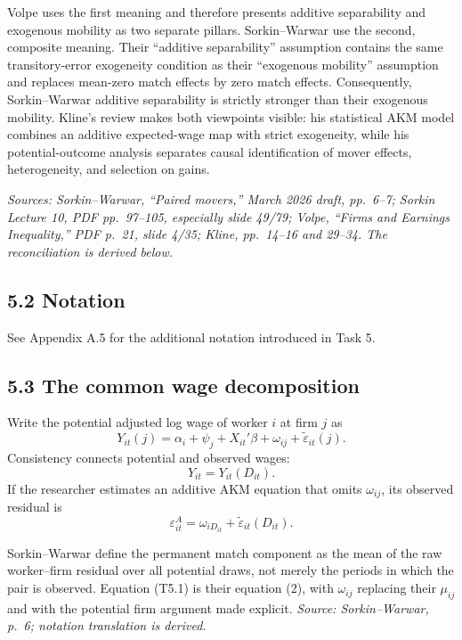\documentclass[11pt]{article}
\begin{document}
Volpe uses the first meaning and therefore presents additive separability and
exogenous mobility as two separate pillars.  Sorkin--Warwar use the second,
composite meaning.  Their ``additive separability'' assumption contains the
same transitory-error exogeneity condition as their ``exogenous mobility''
assumption and replaces mean-zero match effects by zero match effects.
Consequently, Sorkin--Warwar additive separability is strictly stronger than
their exogenous mobility.  Kline's review makes both viewpoints visible:
his statistical AKM model combines an additive expected-wage map with strict
exogeneity, while his potential-outcome analysis separates causal
identification of mover effects, heterogeneity, and selection on gains.

\textit{Sources: Sorkin--Warwar, ``Paired movers,'' March 2026 draft,
pp.\ 6--7; Sorkin Lecture 10, PDF pp.\ 97--105, especially slide 49/79;
Volpe, ``Firms and Earnings Inequality,'' PDF p.\ 21, slide 4/35; Kline,
pp.\ 14--16 and 29--34.  The reconciliation is derived below.}

\subsection{5.2 Notation}

See Appendix A.5 for the additional notation introduced in Task 5.

\subsection{5.3 The common wage decomposition}

Write the potential adjusted log wage of worker \(i\) at firm \(j\) as
\[
Y_{it}(j)
=
\alpha_i+\psi_j+X_{it}'\beta
+\omega_{ij}
+\widetilde\varepsilon_{it}(j).
\tag{T5.1}
\]
Consistency connects potential and observed wages:
\[
Y_{it}=Y_{it}(D_{it}).
\tag{T5.2}
\]
If the researcher estimates an additive AKM equation that omits
\(\omega_{ij}\), its observed residual is
\[
\varepsilon^A_{it}
=
\omega_{iD_{it}}
+\widetilde\varepsilon_{it}(D_{it}).
\tag{T5.3}
\]

Sorkin--Warwar define the permanent match component as the mean of the raw
worker--firm residual over all potential draws, not merely the periods in
which the pair is observed.  Equation (T5.1) is their equation (2), with
\(\omega_{ij}\) replacing their \(\mu_{ij}\) and with the potential firm
argument made explicit.
\textit{Source: Sorkin--Warwar, p.\ 6; notation translation is derived.}
\end{document}
